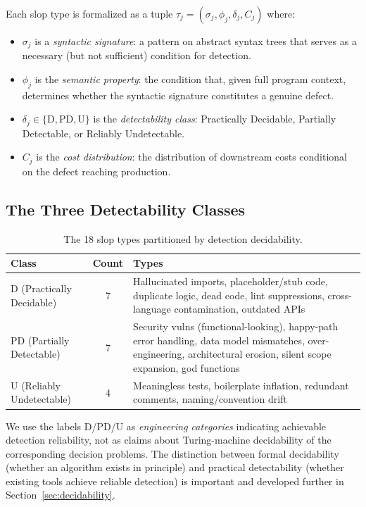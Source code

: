 \documentclass[11pt, a4paper, copyright]{googledeepmind}
\begin{document}
Each slop type is formalized as a tuple $\tau_j = (\sigma_j, \phi_j, \delta_j, C_j)$ where:
\begin{itemize}[nosep]
    \item $\sigma_j$ is a \emph{syntactic signature}: a pattern on abstract syntax trees that serves as a necessary (but not sufficient) condition for detection.
    \item $\phi_j$ is the \emph{semantic property}: the condition that, given full program context, determines whether the syntactic signature constitutes a genuine defect.
    \item $\delta_j \in \{\mathrm{D}, \mathrm{PD}, \mathrm{U}\}$ is the \emph{detectability class}: Practically Decidable, Partially Detectable, or Reliably Undetectable.
    \item $C_j$ is the \emph{cost distribution}: the distribution of downstream costs conditional on the defect reaching production.
\end{itemize}

\subsection{The Three Detectability Classes}

\begin{table}[htbp]
\centering
\caption{The 18 slop types partitioned by detection decidability.}
\label{tab:slop-partition}
\small
\begin{tabularx}{\textwidth}{l c X}
\toprule
\textbf{Class} & \textbf{Count} & \textbf{Types} \\
\midrule
D (Practically Decidable) & 7 & Hallucinated imports, placeholder/stub code, duplicate logic, dead code, lint suppressions, cross-language contamination, outdated APIs \\
\addlinespace
PD (Partially Detectable) & 7 & Security vulns (functional-looking), happy-path error handling, data model mismatches, over-engineering, architectural erosion, silent scope expansion, god functions \\
\addlinespace
U (Reliably Undetectable) & 4 & Meaningless tests, boilerplate inflation, redundant comments, naming/convention drift \\
\bottomrule
\end{tabularx}
\end{table}

We use the labels D/PD/U as \emph{engineering categories} indicating achievable detection reliability, not as claims about Turing-machine decidability of the corresponding decision problems. The distinction between formal decidability (whether an algorithm exists in principle) and practical detectability (whether existing tools achieve reliable detection) is important and developed further in Section~\ref{sec:decidability}.
\end{document}
